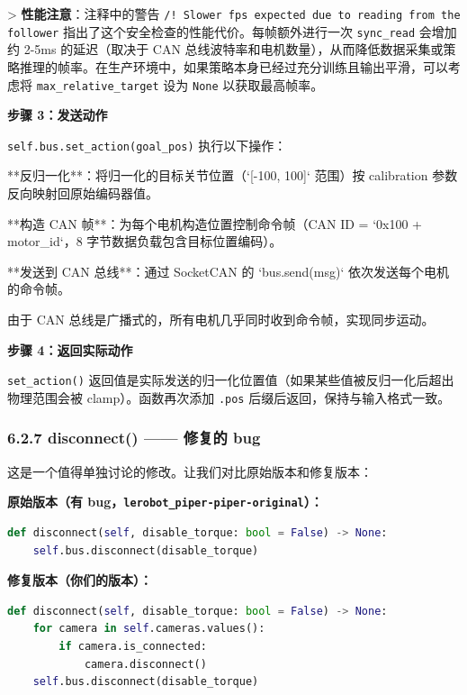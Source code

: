 \documentclass[UTF8,a4paper,11pt]{ctexart}
\begin{document}
{> \textbf{性能注意}：注释中的警告 \texttt{/!\ Slower fps expected due to reading from the follower} 指出了这个安全检查的性能代价。每帧额外进行一次 \texttt{sync_read} 会增加约 2-5ms 的延迟（取决于 CAN 总线波特率和电机数量），从而降低数据采集或策略推理的帧率。在生产环境中，如果策略本身已经过充分训练且输出平滑，可以考虑将 \texttt{max_relative_target} 设为 \texttt{None} 以获取最高帧率。

\textbf{步骤 3：发送动作}

\texttt{self.bus.set_action(goal_pos)} 执行以下操作：

\item[1] **反归一化**：将归一化的目标关节位置（`[-100, 100]` 范围）按 calibration 参数反向映射回原始编码器值。
\item[2] **构造 CAN 帧**：为每个电机构造位置控制命令帧（CAN ID = `0x100 + motor_id`，8 字节数据负载包含目标位置编码）。
\item[3] **发送到 CAN 总线**：通过 SocketCAN 的 `bus.send(msg)` 依次发送每个电机的命令帧。

由于 CAN 总线是广播式的，所有电机几乎同时收到命令帧，实现同步运动。

\textbf{步骤 4：返回实际动作}

\texttt{set_action()} 返回值是实际发送的归一化位置值（如果某些值被反归一化后超出物理范围会被 clamp）。函数再次添加 \texttt{.pos} 后缀后返回，保持与输入格式一致。

\subsubsection{6.2.7 disconnect() —— 修复的 bug}

这是一个值得单独讨论的修改。让我们对比原始版本和修复版本：

\textbf{原始版本（有 bug，\texttt{lerobot_piper-piper-original}）：}

\begin{lstlisting}[language=python]
def disconnect(self, disable_torque: bool = False) -> None:
    self.bus.disconnect(disable_torque)
\end{lstlisting}

\textbf{修复版本（你们的版本）：}

\begin{lstlisting}[language=python]
def disconnect(self, disable_torque: bool = False) -> None:
    for camera in self.cameras.values():
        if camera.is_connected:
            camera.disconnect()
    self.bus.disconnect(disable_torque)
\end{lstlisting}

}
\end{document}
